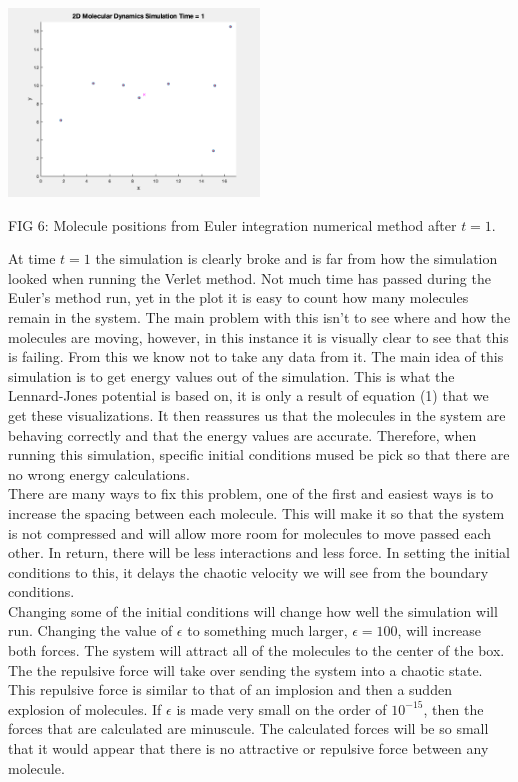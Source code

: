\documentclass[reprint,amsmath,amssymb, aps, 10pt, a4paper, english, reqno]{revtex4-1}
\begin{document}
\begin{multicols}{2}
\begin{center}
    \includegraphics[width=0.50\textwidth]{position_n_289_t_1_bc_euler.png}
    \caption{\small FIG 6: Molecule positions from Euler integration numerical method after $t = 1$.}
\end{center}

At time $t = 1$ the simulation is clearly broke and is far from how the simulation looked when running the Verlet method. Not much time has passed during the Euler's method run, yet in the plot it is easy to count how many molecules remain in the system. The main problem with this isn't to see where and how the molecules are moving, however, in this instance it is visually clear to see that this is failing. From this we know not to take any data from it. The main idea of this simulation is to get energy values out of the simulation. This is what the Lennard-Jones potential is based on, it is only a result of equation (1) that we get these visualizations. It then reassures us that the molecules in the system are behaving correctly and that the energy values are accurate. Therefore, when running this simulation, specific initial conditions mused be pick so that there are no wrong energy calculations. \\

There are many ways to fix this problem, one of the first and easiest ways is to increase the spacing between each molecule. This will make it so that the system is not compressed and will allow more room for molecules to move passed each other. In return, there will be less interactions and less force. In setting the initial conditions to this, it delays the chaotic velocity we will see from the boundary conditions.\\

Changing some of the initial conditions will change how well the simulation will run. Changing the value of $\epsilon$ to something much larger, $\epsilon = 100$, will increase both forces. The system will attract all of the molecules to the center of the box. The the repulsive force will take over sending the system into a chaotic state. This repulsive force is similar to that of an implosion and then a sudden explosion of molecules.  If $\epsilon$ is made very small on the order of $10^{-15}$, then the forces that are calculated are minuscule. The calculated forces will be so small that it would appear that there is no attractive or repulsive force between any molecule.  \\


\end{multicols}
\end{document}
